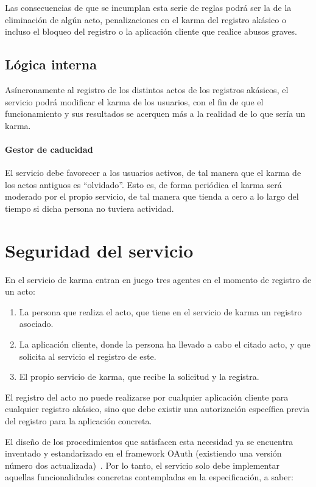\documentclass[main]{subfiles}
\begin{document}
Las consecuencias de que se incumplan esta serie de reglas podrá ser la de la eliminación de algún acto, penalizaciones en el karma del registro akásico o incluso el bloqueo del registro o la aplicación cliente que realice abusos graves.

\subsection{Lógica interna}
Asíncronamente al registro de los distintos actos de los registros akásicos, el servicio podrá modificar el karma de los usuarios, con el fin de que el funcionamiento y sus resultados se acerquen más a la realidad de lo que sería un karma.

\paragraph{Gestor de caducidad}
El servicio debe favorecer a los usuarios activos, de tal manera que el karma de los actos antiguos es \enquote{olvidado}. Esto es, de forma periódica el karma será moderado por el propio servicio, de tal manera que tienda a cero a lo largo del tiempo si dicha persona no tuviera actividad.

\section{Seguridad del servicio}
\label{sec:karma-seguridad}

En el servicio de karma entran en juego tres agentes en el momento de registro de un acto:

\begin{enumerate}
  \item La persona que realiza el acto, que tiene en el servicio de karma un registro asociado.
  \item La aplicación cliente, donde la persona ha llevado a cabo el citado acto, y que solicita al servicio el registro de este.
  \item El propio servicio de karma, que recibe la solicitud y la registra.
\end{enumerate}

El registro del acto no puede realizarse por cualquier aplicación cliente para cualquier registro akásico, sino que debe existir una autorización específica previa del registro para la aplicación concreta.

El diseño de los procedimientos que satisfacen esta necesidad ya se encuentra inventado y estandarizado en el \gls{framework} OAuth (existiendo una versión número dos actualizada)~\autocite{oauthrfc}. Por lo tanto, el servicio solo debe implementar aquellas funcionalidades concretas contempladas en la especificación, a saber:
\end{document}
